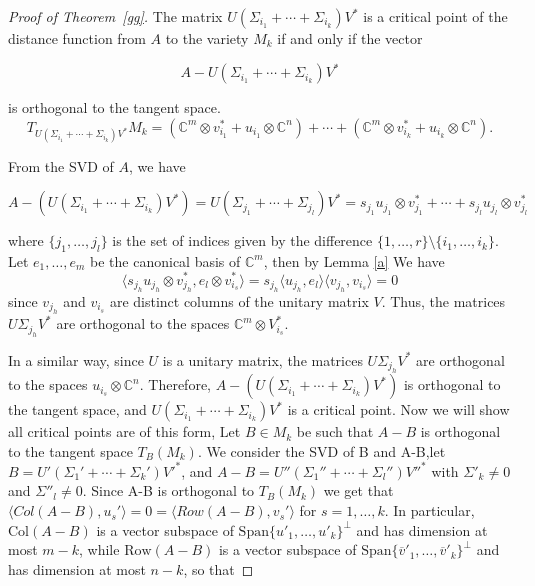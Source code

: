 \documentclass[10pt,a4paper]{amsart}
\begin{document}
\begin{proof}[Proof of Theorem~\ref{gg}]

 The matrix \( U(\Sigma_{i_1} + \cdots + \Sigma_{i_k}) V^* \) is a critical point of the distance function from \( A \) to the variety \( M_k \) if and only if the vector 

\[
A - U(\Sigma_{i_1} + \cdots + \Sigma_{i_k}) V^*
\]

is orthogonal to the tangent space.  \[
T_{U(\Sigma_{i_1} + \cdots + \Sigma_{i_k}) V^*} M_k = (\mathbb{C}^m \otimes{ v^*_{i_1}}+ u_{i_1} \otimes \mathbb{C}^n) + \cdots + (\mathbb{C}^m \otimes {v^*_{i_k}} + u_{i_k} \otimes \mathbb{C}^n).
\]

From the SVD of \( A \), we have 

\[
A - (U(\Sigma_{i_1} + \cdots + \Sigma_{i_k}) V^*) = U(\Sigma_{j_1} + \cdots + \Sigma_{j_l}) V^* = s_{j_1} u_{j_1} \otimes v^*_{j_1} + \cdots + s_{j_l} u_{j_l} \otimes v^*_{j_l}
\]

where \( \{j_1, \ldots, j_l\} \) is the set of indices given by the difference \( \{1, \ldots, r\} \setminus \{i_1, \ldots, i_k\} \). Let $e_1,\dots,e_m$ be the canonical basis of $\mathbb{C}^m$, then by Lemma \ref{a} We have \[
\langle s_{j_h} u_{j_h} \otimes v^*_{j_h}, e_l \otimes v^*_{i_s} \rangle = s_{j_h} \langle u_{j_h}, e_l \rangle \langle v_{j_h}, v_{i_s} \rangle = 0
\]
since \( v_{j_h} \) and \( v_{i_s} \) are distinct columns of the unitary matrix \( V \). Thus, the matrices \( U\Sigma_{j_h} V^* \) are orthogonal to the spaces \( \mathbb{C}^m \otimes V^*_{i_s} \).

In a similar way, since \( U \) is a unitary matrix, the matrices \( U\Sigma_{j_h} V^* \) are orthogonal to the spaces \( u_{i_s} \otimes \mathbb{C}^n \). Therefore, \( A - (U(\Sigma_{i_1} + \cdots + \Sigma_{i_k}) V^*) \) is orthogonal to the tangent space, and \( U(\Sigma_{i_1} + \cdots + \Sigma_{i_k}) V^* \) is a critical point. Now we will show all critical points are of this form, Let $B\in M_k$ be such that $A-B$ is orthogonal to the tangent space $T_B(M_k)$. We consider the SVD of B and A-B,let \( B = U'(\Sigma_1' + \cdots + \Sigma_k')V'^* \), and $
A - B = U''(\Sigma_1'' + \cdots + \Sigma_l'')V''^*
$
with \( \Sigma'_k \neq 0 \) and \( \Sigma''_l \neq 0 \). Since A-B is orthogonal to $T_B(M_k)$ we get that $\langle Col(A-B),u_s'\rangle=0=\langle Row(A-B),v_s'\rangle$ for $s= 1 ,\dots, k$. In particular, \(\text{Col}(A - B)\) is a vector subspace of \(\text{Span}\{u'_1, \ldots, u'_k\}^\perp\) and has dimension at most \(m - k\), while \(\text{Row}(A - B)\) is a vector subspace of \(\text{Span}\{\overline{v}'_1, \ldots, \overline{v}'_k\}^\perp\) and has dimension at most \(n - k\), so that 


\end{proof}
\end{document}
